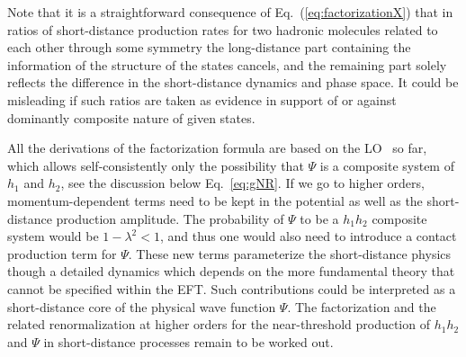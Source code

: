 Note that it is a straightforward consequence of Eq.~(\ref{eq:factorizationX})
that in ratios of short-distance production rates for two
hadronic molecules related to each other through some symmetry the long-distance
part containing the information of the structure of the states cancels, and the remaining part solely reflects the difference in the
short-distance dynamics and phase space. It could be misleading if such ratios
are taken as evidence in support of or against dominantly composite nature of
given states.



All the derivations of the factorization formula are based on the LO \nreftii~so
far, which allows self-consistently only the possibility that $\Psi$ is a
composite system of $h_1$ and $ h_2$, see the discussion below
Eq.~\eqref{eq:gNR}. If we go to higher orders, momentum-dependent terms need to
be kept in the potential as well as the short-distance production amplitude.
The probability of $\Psi$ to be a $h_1h_2$ composite system would be
$1-\lambda^2<1$, and thus one would also need to introduce a contact
production term for $\Psi$.  These new terms parameterize the
short-distance physics though a detailed dynamics which depends on the more
fundamental theory that cannot be specified within the EFT. Such contributions
could
be interpreted as a short-distance core of the physical wave function $\Psi$.
 The factorization and the related renormalization at higher orders for
the near-threshold production of $h_1 h_2$ and $\Psi$ in short-distance
processes remain to be worked out.


